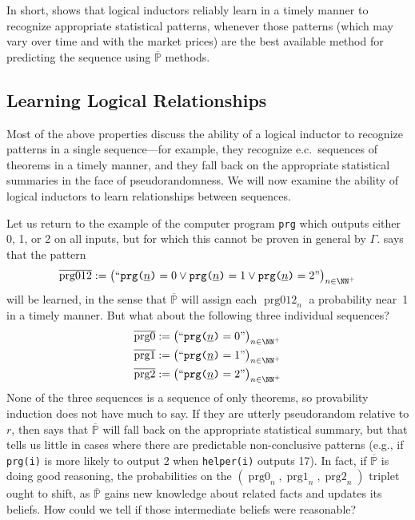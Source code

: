 \documentclass[authordate,onecolumn,noenvironments]{miri-tech-article}
\numberwithin{equation}{subsection}
\newcommand{\quot}[1]{``#1"}
\newcommand{\enc}[1]{{\underline{#1}}}
\newcommand{\seq}[1]{{\overline{#1}}}
\newcommand{\runtime}{r}
\newcommand{\nn}{n}
\newcommand{\ec}[1][\ ]{e.c.#1}
\newcommand{\pgenable}{\ensuremath{\MP}\text{-generable}\xspace}
\newcommand{\BelState}{\mathbb{P}}
\newcommand{\pt}{\BelState}
\newcommand{\MP}{\seq{\pt}}
\newcommand{\Theory}{\Gamma}
\newcommand{\prgzot}{\mathit{\operatorname{prg012}}}
\newcommand{\prgz}{\mathit{\operatorname{prg0}}}
\newcommand{\prgo}{\mathit{\operatorname{prg1}}}
\newcommand{\prgt}{\mathit{\operatorname{prg2}}}
\begin{document}
In short,  shows that logical inductors reliably learn in a timely manner to recognize appropriate statistical patterns, whenever those patterns (which may vary over time and with the market prices) are the best available method for predicting the sequence using \pgenable methods.


\subsection{Learning Logical Relationships}\label{sec:logicpatterns}

Most of the above properties discuss the ability of a logical inductor to recognize patterns in a single sequence---for example, they recognize \ec sequences of theorems in a timely manner, and they fall back on the appropriate statistical summaries in the face of pseudorandomness. We will now examine the ability of logical inductors to learn relationships between sequences.

Let us return to the example of the computer program \texttt{prg} which outputs either 0, 1, or 2 on all inputs, but for which this cannot be proven in general by $\Theory$.  says that the pattern
\[
  \seq{\prgzot} := \big( \quot{\texttt{prg($\enc{n}$)}=0 \lor \texttt{prg($\enc{n}$)}=1 \lor \texttt{prg($\enc{n}$)}=2} \big)_{\nn\in {\NN^+}}
\]
will be learned, in the sense that $\MP$ will assign each $\prgzot_\nn$ a probability near~1 in a timely manner. But what about the following three individual sequences?
\begin{align*}
  \seq{\prgz} := \big( \quot{\texttt{prg($\enc{n}$)}=0} \big)_{\nn\in {\NN^+}} \\
  \seq{\prgo} := \big( \quot{\texttt{prg($\enc{n}$)}=1} \big)_{\nn\in {\NN^+}} \\
  \seq{\prgt} := \big( \quot{\texttt{prg($\enc{n}$)}=2} \big)_{\nn\in {\NN^+}}
\end{align*}
None of the three sequences is a sequence of only theorems, so provability induction does not have much to say. If they are utterly pseudorandom relative to $\runtime$, then  says that $\MP$ will fall back on the appropriate statistical summary, but that tells us little in cases where there are predictable non-conclusive patterns (e.g., if \texttt{prg(i)} is more likely to output 2 when \texttt{helper(i)} outputs 17). In fact, if $\MP$ is doing good reasoning, the probabilities on the $(\prgz_\nn, \prgo_\nn, \prgt_\nn)$ triplet ought to shift, as $\MP$ gains new knowledge about related facts and updates its beliefs. How could we tell if those intermediate beliefs were reasonable?
\end{document}
